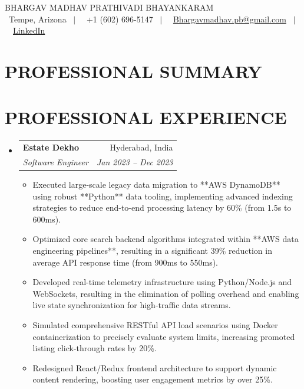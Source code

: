 \documentclass[letterpaper,10pt]{article}
\makeatletter
\newcommand{\resumeItem}[1]{\item\small{{#1 \vspace{-2pt}}}}
\newcommand{\resumeSubheading}[4]{
  \vspace{-1pt}\item
    \begin{tabular*}{0.97\textwidth}[t]{l@{\extracolsep{\fill}}r}
      \textbf{#1} & #2 \\
      \textit{\small#3} & \textit{\small #4} \\
    \end{tabular*}\vspace{-5pt}
}
\newcommand{\resumeSubHeadingListStart}{\begin{itemize}[leftmargin=0.15in, label={}]}
\newcommand{\resumeSubHeadingListEnd}{\end{itemize}}
\newcommand{\resumeItemListStart}{\begin{itemize}}
\newcommand{\resumeItemListEnd}{\end{itemize}\vspace{-5pt}}
\makeatother
\begin{document}
\begin{center}
    {\Huge \scshape BHARGAV MADHAV PRATHIVADI BHAYANKARAM} \\ \vspace{5pt}
    \small 
    \faMapMarker* \ Tempe, Arizona \ $|$ \ 
    \faPhone \ +1 (602) 696-5147 \ $|$ \ 
    \faEnvelope \ \href{mailto:Bhargavmadhav.pb@gmail.com}{Bhargavmadhav.pb@gmail.com} \ $|$ \ 
    \faLinkedin \ \href{https://linkedin.com/in/bhargav-madhav}{LinkedIn}
\end{center}

\section{PROFESSIONAL SUMMARY}
\small

\vspace{-5pt}

\section{PROFESSIONAL EXPERIENCE}
\resumeSubHeadingListStart
\resumeSubheading{Estate Dekho}{Hyderabad, India}{Software Engineer}{Jan 2023 -- Dec 2023} \resumeItemListStart \resumeItem{Executed large-scale legacy data migration to **AWS DynamoDB** using robust **Python** data tooling, implementing advanced indexing strategies to reduce end-to-end processing latency by 60\% (from 1.5s to 600ms).}
\resumeItem{Optimized core search backend algorithms integrated within **AWS data engineering pipelines**, resulting in a significant 39\% reduction in average API response time (from 900ms to 550ms).}
\resumeItem{Developed real-time telemetry infrastructure using Python/Node.js and WebSockets, resulting in the elimination of polling overhead and enabling live state synchronization for high-traffic data streams.}
\resumeItem{Simulated comprehensive RESTful API load scenarios using Docker containerization to precisely evaluate system limits, increasing promoted listing click-through rates by 20\%.}
\resumeItem{Redesigned React/Redux frontend architecture to support dynamic content rendering, boosting user engagement metrics by over 25\%.}
 \resumeItemListEnd
\resumeSubHeadingListEnd

\end{document}
